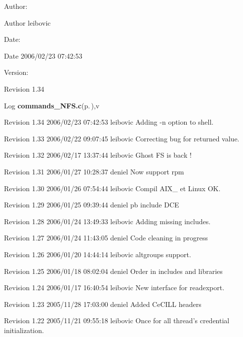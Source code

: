 \begin{Desc}
\item[Author:]\begin{Desc}
\item[Author]leibovic \end{Desc}
\end{Desc}
\begin{Desc}
\item[Date:]\begin{Desc}
\item[Date]2006/02/23 07:42:53 \end{Desc}
\end{Desc}
\begin{Desc}
\item[Version:]\begin{Desc}
\item[Revision]1.34 \end{Desc}
\end{Desc}
\begin{Desc}
\item[Log]{\bf commands\_\-NFS.c}{\rm (p.\,\pageref{commands__NFS_8c})},v \end{Desc}
Revision 1.34 2006/02/23 07:42:53 leibovic Adding -n option to shell.

Revision 1.33 2006/02/22 09:07:45 leibovic Correcting bug for returned value.

Revision 1.32 2006/02/17 13:37:44 leibovic Ghost FS is back !

Revision 1.31 2006/01/27 10:28:37 deniel Now support rpm

Revision 1.30 2006/01/26 07:54:44 leibovic Compil AIX\_ et Linux OK.

Revision 1.29 2006/01/25 09:39:44 deniel pb include DCE

Revision 1.28 2006/01/24 13:49:33 leibovic Adding missing includes.

Revision 1.27 2006/01/24 11:43:05 deniel Code cleaning in progress

Revision 1.26 2006/01/20 14:44:14 leibovic altgroups support.

Revision 1.25 2006/01/18 08:02:04 deniel Order in includes and libraries

Revision 1.24 2006/01/17 16:40:54 leibovic New interface for readexport.

Revision 1.23 2005/11/28 17:03:00 deniel Added Ce\-CILL headers

Revision 1.22 2005/11/21 09:55:18 leibovic Once for all thread's credential initialization.

